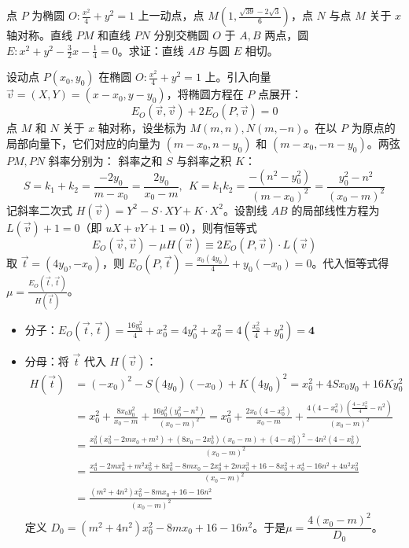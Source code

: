 \begin{exercise}
点 $P$ 为椭圆 $O:\frac{x^2}{4}+y^2=1$ 上一动点，点 $M\left(1,\frac{\sqrt{39}-2\sqrt{3}}{6}\right)$，点 $N$ 与点 $M$ 关于 $x$ 轴对称。直线 $PM$ 和直线 $PN$ 分别交椭圆 $O$ 于 $A,B$ 两点，圆 $E:x^2+y^2-\frac32x-\frac14=0$。求证：直线 $AB$ 与圆 $E$ 相切。
\end{exercise}
\begin{solution}
设动点 $P(x_0, y_0)$ 在椭圆 $O: \frac{x^2}{4} + y^2 = 1$ 上。引入向量 $\vec{v} = (X, Y) = (x-x_0, y-y_0)$，将椭圆方程在 $P$ 点展开：
$$E_O(\vec{v}, \vec{v}) + 2E_O(P, \vec{v}) = 0$$
点 $M$ 和 $N$ 关于 $x$ 轴对称，设坐标为 $M(m, n), N(m, -n)$。在以 $P$ 为原点的局部向量下，它们对应的向量为 $(m-x_0, n-y_0)$ 和 $(m-x_0, -n-y_0)$。两弦 $PM, PN$ 斜率分别为：
斜率之和 $S$ 与斜率之积 $K$：
$$S = k_1 + k_2 = \frac{-2y_0}{m-x_0} = \frac{2y_0}{x_0-m},~~K = k_1 k_2 = \frac{-(n^2 - y_0^2)}{(m-x_0)^2} = \frac{y_0^2 - n^2}{(x_0-m)^2}$$
记斜率二次式 $H(\vec{v}) = Y^2 - S \cdot XY + K \cdot X^2$。设割线 $AB$ 的局部线性方程为 $L(\vec{v}) + 1 = 0$（即 $uX+vY+1=0$），则有恒等式
$$E_O(\vec{v}, \vec{v}) - \mu H(\vec{v}) \equiv 2E_O(P, \vec{v}) \cdot L(\vec{v})$$
取 $\vec{t} = (4y_0, -x_0)$，则 $E_O(P, \vec{t}) = \frac{x_0(4y_0)}{4} + y_0(-x_0) = 0$。代入恒等式得 $\mu = \frac{E_O(\vec{t}, \vec{t})}{H(\vec{t})}$。
\begin{itemize}
\item 分子：$E_O(\vec{t}, \vec{t}) = \frac{16y_0^2}{4} + x_0^2 = 4y_0^2 + x_0^2 = 4\left(\frac{x_0^2}{4} + y_0^2\right) = \mathbf{4}$
\item 分母：将 $\vec{t}$ 代入 $H(\vec{v})$：
\begin{align*}
H(\vec{t}) &= (-x_0)^2 - S(4y_0)(-x_0) + K(4y_0)^2 = x_0^2 + 4S x_0 y_0 + 16K y_0^2\\
&=  x_0^2 + \frac{8x_0 y_0^2}{x_0-m} + \frac{16y_0^2(y_0^2 - n^2)}{(x_0-m)^2}=x_0^2 + \frac{2x_0(4-x_0^2)}{x_0-m} + \frac{4(4-x_0^2) \left( \frac{4-x_0^2}{4} - n^2 \right)}{(x_0-m)^2}\\
&=\frac{x_0^2(x_0^2 - 2mx_0 + m^2) + (8x_0 - 2x_0^3)(x_0 - m) + (4-x_0^2)^2 - 4n^2(4-x_0^2)}{(x_0-m)^2}\\
&= \frac{x_0^4 - 2mx_0^3 + m^2 x_0^2 + 8x_0^2 - 8mx_0 - 2x_0^4 + 2mx_0^3 + 16 - 8x_0^2 + x_0^4 - 16n^2 + 4n^2 x_0^2}{(x_0-m)^2}\\
&=\frac{(m^2 + 4n^2)x_0^2 - 8mx_0 + 16 - 16n^2}{(x_0-m)^2}
\end{align*}
定义 $D_0 = (m^2 + 4n^2)x_0^2 - 8mx_0 + 16 - 16n^2$。于是$\mu = \dfrac{4(x_0-m)^2}{D_0}$。
\end{itemize}

\end{solution}

